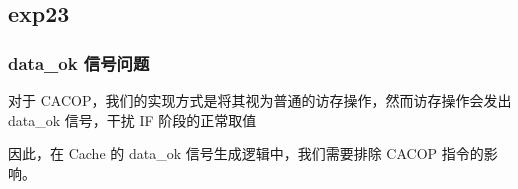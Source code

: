 \subsection{exp23}

\subsubsection{data_ok 信号问题}

对于 CACOP，我们的实现方式是将其视为普通的访存操作，然而访存操作会发出 data_ok 信号，干扰 IF 阶段的正常取值

因此，在 Cache 的 data_ok 信号生成逻辑中，我们需要排除 CACOP 指令的影响。
